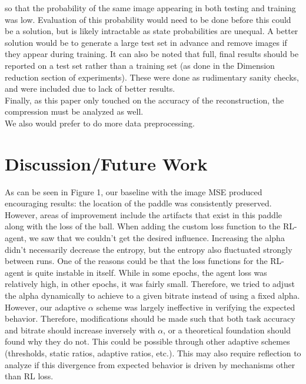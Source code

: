 so that the probability of the same image appearing in both testing and training
was low. Evaluation of this probability would need to be done before this could
be a solution, but is likely intractable as state probabilities are unequal. A
better solution would be to generate a large test set in advance and remove
images if they appear during training. It can also be noted that full, final
results should be reported on a test set rather than a training set (as done in
the Dimension reduction section of experiments). These were done as rudimentary
sanity checks, and were included due to lack of better results.\\
Finally, as this paper only touched on the accuracy of the reconstruction, the
compression must be analyzed as well. \\
We also would prefer to do more data preprocessing.


\section{Discussion/Future Work}
As can be seen in Figure 1, our baseline with the image MSE produced encouraging
results: the location of the paddle was consistently preserved. However, areas
of improvement include the artifacts that exist in this paddle along with the
loss of the ball.
When adding the custom loss function to the RL-agent, we saw that we couldn't
get the desired influence. Increasing the alpha didn't necessarily decrease the
entropy, but the entropy also fluctuated strongly between runs. One of the
reasons could be that the loss functions for the RL-agent is quite instable in
itself. While in some epochs, the agent loss was relatively high, in other
epochs, it was fairly small. Therefore, we tried to adjust the alpha dynamically
to achieve to a given bitrate instead of using a fixed alpha. However, our
adaptive $\alpha$ scheme was largely ineffective in verifying the expected
behavior. Therefore, modifications should be made such that both task accuracy
and bitrate should increase inversely with $\alpha$, or a theoretical foundation
should found why they do not. This could be possible through other adaptive
schemes (thresholds, static ratios, adaptive ratios, etc.). This may also
require reflection to analyze if this divergence from expected behavior is
driven by mechanisms other than RL loss. \\


